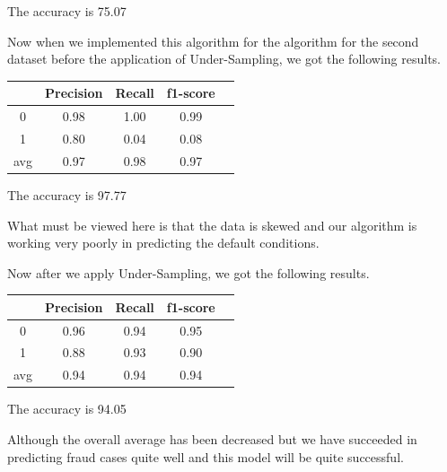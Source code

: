 \begin{center}
The accuracy is 75.07%
\end{center} 
Now when we implemented this algorithm for the algorithm for the second dataset before the application of Under-Sampling, we got the following results.

\begin{center}
\begin{tabular}{| c | c | c | c | c |}
\hline
    & Precision & Recall & f1-score\\
\hline
0 & 0.98 & 1.00 & 0.99 \\
\hline
1 & 0.80 & 0.04 & 0.08 \\
\hline
avg & 0.97 & 0.98 & 0.97 \\
\hline
\end{tabular}
\end{center}
\begin{center}
The accuracy is 97.77%
\end{center}
\par What must be viewed here is that the data is skewed and our algorithm is working very poorly in predicting the default conditions.
\par Now after we apply Under-Sampling, we got the following results.

\begin{center}
\begin{tabular}{| c | c | c | c | c |}
\hline
    & Precision & Recall & f1-score \\
\hline
0 & 0.96 & 0.94 & 0.95 \\
\hline
1 & 0.88 & 0.93 & 0.90 \\
\hline
avg & 0.94 & 0.94 & 0.94 \\
\hline
\end{tabular}
\end{center}
\begin{center}
The accuracy is 94.05%
\end{center}
Although the overall average has been decreased but we have succeeded in predicting fraud cases quite well and this model will be quite successful.
